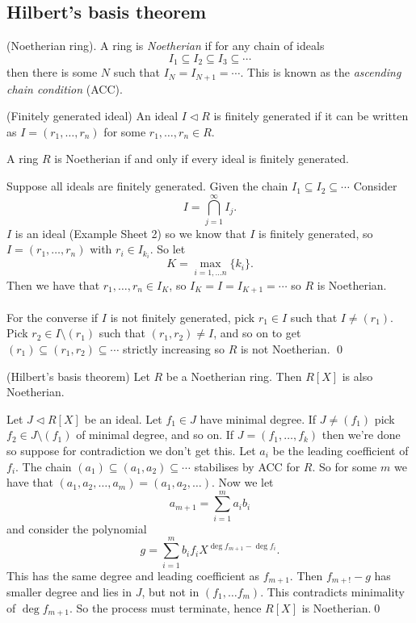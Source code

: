 \documentclass{article}
\newcommand{\nrm}{\triangleleft}
\begin{document}
\begin{itemize}
\subsection{Hilbert's basis theorem}
\begin{definition}
	(Noetherian ring). A ring is \textit{Noetherian} if for any chain of ideals
	\[
	  I_1\subseteq I_2\subseteq I_3\subseteq \cdots
	\]
	then there is some $ N $ such that $ I_N=I_{N+1}=\cdots $. This is known as the \textit{ascending chain condition} (ACC).
\end{definition}
\begin{definition}
	(Finitely generated ideal) An ideal $ I\nrm R $ is finitely generated if it can be written as $ I=(r_1,\dots, r_n) $ for some $ r_1,\dots, r_n\in R $.
\end{definition}
\begin{proposition}
  A ring $ R $ is Noetherian if and only if every ideal is finitely generated.
\end{proposition}
\pf Suppose all ideals are finitely generated. Given the chain $ I_1\subseteq I_2\subseteq \cdots $ Consider
\[
	I=\bigcap_{j=1}^\infty I_j.
\]
$ I $ is an ideal (Example Sheet 2) so we know that $ I $ is finitely generated, so $ I=(r_1,\dots,r_n) $ with $ r_i\in I_{k_i} $. So let
\[
	K=\max_{i=1,\dots n}\{k_i\}.
\]
Then we have that $ r_1,\dots,r_n\in I_K $, so $ I_K=I=I_{K+1}=\cdots $ so $ R $ is Noetherian.\\\\
For the converse if $ I $ is not finitely generated, pick $ r_1\in I $ such that $ I\ne (r_1) $. Pick $ r_2\in I\setminus (r_1) $ such that $ (r_1,r_2)\ne I $, and so on to get $ (r_1)\subseteq (r_1,r_2)\subseteq \cdots $ strictly increasing so $ R $ is not Noetherian. \qed
\begin{theorem}
	(Hilbert's basis theorem) Let $ R $ be a Noetherian ring. Then $ R[X] $ is also Noetherian.
\end{theorem}
\pf Let $ J\nrm R[X] $ be an ideal. Let $ f_1\in J $ have minimal degree. If $ J \ne (f_1) $ pick $ f_2\in J\setminus (f_1) $ of minimal degree, and so on. If $ J=(f_1,\dots, f_k) $ then we're done so suppose for contradiction we don't get this. Let $ a_i $ be the leading coefficient of $ f_i $. The chain $ (a_1)\subseteq (a_1,a_2)\subseteq \cdots $ stabilises by ACC for $ R $. So for some $ m $ we have that $ (a_1,a_2,\dots, a_m)=(a_1,a_2,\dots) $. Now we let
\[
	a_{m+1}=\sum_{i=1}^ma_ib_i
\]
and consider the polynomial
\[
	g=\sum_{i=1}^mb_if_iX^{\deg f_{m+1}-\deg f_i}.
\]
This has the same degree and leading coefficient as $ f_{m+1} $. Then $ f_{m+!}-g $ has smaller degree and lies in $ J $, but not in $ (f_1,\dots f_m) $. This contradicts minimality of $ \deg f_{m+1} $. So the process must terminate, hence $ R[X] $ is Noetherian.\qed

\end{itemize}
\end{document}
